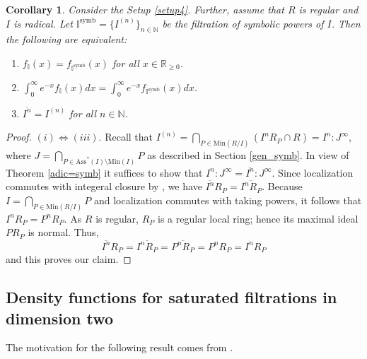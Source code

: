 \documentclass[12pt,a4paper]{amsart}
\theoremstyle{plain}
\newtheorem{corollary}[theorem]{Corollary}
\theoremstyle{definition}
\numberwithin{equation}{theorem}
\begin{document}
\begin{corollary}\label{sym_reg}
Consider the Setup \ref{setup4}. Further, assume that $R$ is regular and $I$ is radical. Let $\mathbb{I}^{\mathrm{symb}} = \{I^{(n)}\}_{n\in\mathbb{N}}$ be the filtration of symbolic powers of $I$. Then the following are equivalent:
 \begin{enumerate}[$(i)$]
  \item $\displaystyle f_{\mathbb{I}}(x) = f_{\mathbb{I}^{\mathrm{symb}}}(x)$ for all $x\in\mathbb{R}_{\geq 0}$.
  \item $\displaystyle \int_0^{\infty}e^{-x}f_{\mathbb{I}}(x) dx = \int_0^{\infty}e^{-x}f_{\mathbb{I}^{\mathrm{symb}}}(x) dx$.
  \item $\displaystyle \overline{I^n} = I^{(n)}$ for all $n\in\mathbb{N}$.
 \end{enumerate}
\end{corollary}
\begin{proof}
$(i) \iff (iii)$. Recall that $I^{(n)} = \bigcap_{P\in\mathrm{Min}(R/I)}(I^nR_P \cap R) = I^n \colon J^{\infty}$, where $J=\bigcap_{P\in \mathrm{Ass}^*(I)\setminus \mathrm{Min}(I)} P$ as described in Section \ref{gen_symb}. In view of Theorem \ref{adic=symb} it suffices to show that $I^n \colon J^{\infty} = \overline{I^n} \colon J^{\infty}$. Since localization commutes with integeral closure by \cite[Proposition 1.1.4]{HS06}, we have $\overline{I^n}R_P = \overline{I^n R_P}$. Because $I=\bigcap_{P\in\mathrm{Min}(R/I)}P$ and localization commutes with taking powers, it follows that $I^n R_P = P^nR_P$. As $R$ is regular, $R_P$ is a regular local ring; hence its maximal ideal $PR_P$ is normal. Thus, $$\overline{I^n}R_P = \overline{I^n R_P} = \overline{P^nR_P} = P^nR_P = I^nR_P$$ and this proves our claim.
\end{proof}

\subsection{Density functions for saturated filtrations in dimension two}

The motivation for the following result comes from \cite[Lemma 6.8]{DDRV25}.
\end{document}

